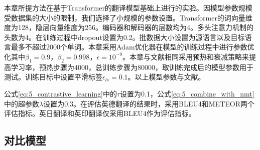 本章所提方法在基于Transformer的翻译模型基础上进行的实验。因模型参数规模受数据集的大小的限制，我们选择了小规模的参数设置。Transformer的词向量维度为128，隐层向量维度为256。编码器和解码器的层数均为4。多头注意力机制的头数为4。在训练过程中dropout设置为0.2。批数据大小设置为源语言以及目标语言最多不超过2000个单词。本章采用Adam优化器在模型的训练过程中进行参数优化其中$\beta_1=0.9$，$\beta_2=0.998$，$\epsilon=10^{-9}$。本章与文献\cite{5_DBLP:journals/corr/VaswaniSPUJGKP17}相同采用预热和衰减策略来提高学习率，预热步骤为4000，总训练步骤为80000，取训练完成后的模型参数用于测试。训练目标中设置平滑标签$\epsilon_{ls}=0.1$。以上模型参数与文献\cite{33_yin-etal-2020-novel}。

公式\ref{eq:5_contrastive_learning}中的$\tau$设置为0.1，公式\ref{eq:5_combine_with_nmt}中的超参数$\lambda$设置为0.3。在评估英德翻译的结果时，采用BLEU4\cite{42_papineni-etal-2002-bleu}和METEOR\cite{46_denkowski-lavie-2014-meteor}两个评估指标。英日翻译和英印翻译仅采用BLEU4作为评估指标。

\subsection{对比模型}

